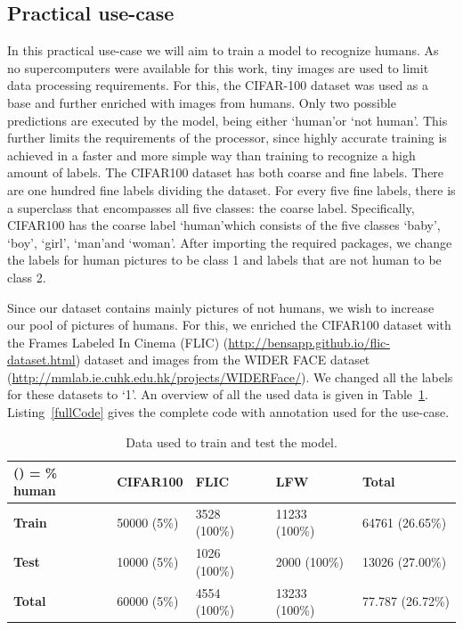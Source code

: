 \subsection{Practical use-case \label{subsec:case}}
In this practical use-case we will aim to train a model to recognize humans. As no supercomputers were available for this work, tiny images are used to limit data processing requirements. For this, the CIFAR-100 dataset was used as a base and further enriched with images from humans. Only two possible predictions are executed by the model, being either \textquoteleft human\textquoteright  or \textquoteleft not human\textquoteright . This further limits the requirements of the processor, since highly accurate training is achieved in a faster and more simple way than training to recognize a high amount of labels. 
The CIFAR100 dataset has both coarse and fine labels. There are one hundred fine labels dividing the dataset. For every five fine labels, there is a superclass that encompasses all five classes: the coarse label. Specifically, CIFAR100 has  the coarse label \textquoteleft human\textquoteright  which consists of the five classes \textquoteleft baby\textquoteright , \textquoteleft boy\textquoteright , \textquoteleft girl\textquoteright , \textquoteleft man\textquoteright and \textquoteleft woman\textquoteright. After importing the required packages, we change the labels for human pictures to be class 1 and labels that are not human to be class 2.

Since our dataset contains mainly pictures of not humans, we wish to increase our pool of pictures of humans. For this, we enriched the CIFAR100 dataset with the Frames Labeled In Cinema (FLIC) (\url{http://bensapp.github.io/flic-dataset.html})  dataset and images from the WIDER FACE dataset (\url{http://mmlab.ie.cuhk.edu.hk/projects/WIDERFace/}). We changed all the labels for these datasets to \textquoteleft 1\textquoteright . An overview of all the used data is given in Table~\ref{tab:data}. Listing~\ref{fullCode} gives the complete code with annotation used for the use-case. 

\begin{table}[h]
	\centering
	\caption{Data used to train and test the model. \label{tab:data}}
	\begin{tabular}{l|llll}
		\textbf{() = \% human} & \textbf{CIFAR100} & \textbf{FLIC} & \textbf{LFW} & \textbf{Total} \\ \hline
		\textbf{Train}         & 50000 (5\%)                            & 3528 (100\%)                       & 11233 (100\%)                     & 64761 (26.65\%)                     \\ \cline{1-1}
		\textbf{Test}          & 10000 (5\%)                            & 1026 (100\%)                       & 2000 (100\%)                      & 13026 (27.00\%)                     \\ \cline{1-1}
		\textbf{Total}         & 60000 (5\%)                            & 4554 (100\%)                       & 13233 (100\%)                     & 77.787 (26.72\%)                    \\ \cline{1-1}
	\end{tabular}
\end{table}



